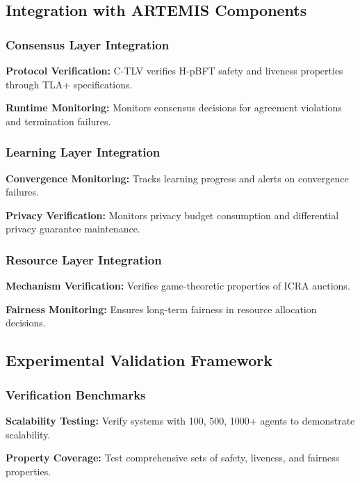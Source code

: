 \documentclass[conference]{IEEEtran}
\begin{document}
\subsection{Integration with ARTEMIS Components}

\subsubsection{Consensus Layer Integration}

\textbf{Protocol Verification:} C-TLV verifies H-pBFT safety and liveness properties through TLA+ specifications.

\textbf{Runtime Monitoring:} Monitors consensus decisions for agreement violations and termination failures.

\subsubsection{Learning Layer Integration}

\textbf{Convergence Monitoring:} Tracks learning progress and alerts on convergence failures.

\textbf{Privacy Verification:} Monitors privacy budget consumption and differential privacy guarantee maintenance.

\subsubsection{Resource Layer Integration}

\textbf{Mechanism Verification:} Verifies game-theoretic properties of ICRA auctions.

\textbf{Fairness Monitoring:} Ensures long-term fairness in resource allocation decisions.

\subsection{Experimental Validation Framework}

\subsubsection{Verification Benchmarks}

\textbf{Scalability Testing:} Verify systems with 100, 500, 1000+ agents to demonstrate scalability.

\textbf{Property Coverage:} Test comprehensive sets of safety, liveness, and fairness properties.
\end{document}
